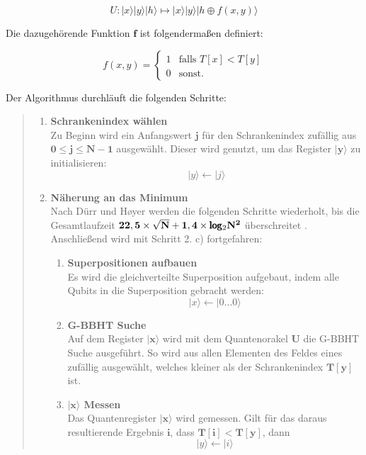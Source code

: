 \begin{equation}
	U: |x\rangle|y\rangle|h\rangle \mapsto |x\rangle|y\rangle|h \oplus f(x,y)\rangle
\end{equation}

Die dazugehörende Funktion $\mathbf{f}$ ist folgendermaßen definiert:

\begin{equation}
	f(x,y) = \begin{cases}
		1 & \text{falls } T[x] < T[y]\\    
		0 & \text{sonst.}   
	\end{cases}
\end{equation}

Der Algorithmus durchläuft die folgenden Schritte:

\begin{quote}
	\begin{enumerate}
		\item \textbf{Schrankenindex wählen}
		\\
		Zu Beginn wird ein Anfangswert $\mathbf{j}$ für den Schrankenindex zufällig aus $\mathbf{0 \leq j \leq N-1}$ ausgewählt. Dieser wird genutzt, um das Register $\mathbf{|y\rangle}$ zu initialisieren: 
		\begin{equation}
			|y\rangle \leftarrow |j\rangle
		\end{equation}
		\item \textbf{Näherung an das Minimum}
		\\
		Nach Dürr und Høyer werden die folgenden Schritte wiederholt, bis die Gesamtlaufzeit $\mathbf{22,5 \times \sqrt{N} + 1,4 \times \pmb\log\textsubscript{2}N^2}$ überschreitet \cite[S. 141]{Ho96}. 
		Anschließend wird mit Schritt 2. c) fortgefahren:
		\\
		\begin{enumerate}
			\item \textbf{Superpositionen aufbauen}
			\\
			Es wird die gleichverteilte Superposition aufgebaut, indem alle Qubits in die Superposition gebracht werden:
			\begin{equation}
				|x\rangle \leftarrow |0 ... 0 \rangle
			\end{equation}
			\item \textbf{G-BBHT Suche}
			\\
			Auf dem Register $\mathbf{|x\rangle}$ wird mit dem Quantenorakel $\mathbf{U}$ die G-BBHT Suche ausgeführt. 
			So wird aus allen Elementen des Feldes eines zufällig ausgewählt, welches kleiner als der Schrankenindex $\mathbf{T[y]}$ ist.
			\item \textbf{$\mathbf{|x\rangle}$ Messen}
			\\
			Das Quantenregister $\mathbf{|x\rangle}$ wird gemessen. 
			Gilt für das daraus resultierende Ergebnis $\mathbf{i}$, dass $\mathbf{T[i] < T[y]}$, dann 
			\begin{equation}
				|y\rangle \leftarrow |i\rangle
			\end{equation}
		\end{enumerate}
		

\end{enumerate}
\end{quote}
